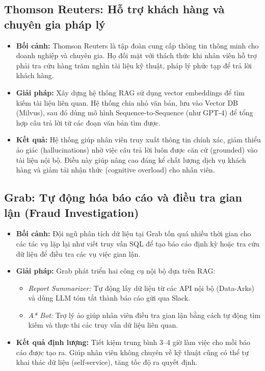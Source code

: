 \documentclass[12pt,a4paper]{report}
\begin{document}
\subsection{Thomson Reuters: Hỗ trợ khách hàng và chuyên gia pháp lý}
\begin{itemize}
    \item \textbf{Bối cảnh:} Thomson Reuters là tập đoàn cung cấp thông tin thông minh cho doanh nghiệp và chuyên gia. Họ đối mặt với thách thức khi nhân viên hỗ trợ phải tra cứu hàng trăm nghìn tài liệu kỹ thuật, pháp lý phức tạp để trả lời khách hàng.
    \item \textbf{Giải pháp:} Xây dựng hệ thống RAG sử dụng vector embeddings để tìm kiếm tài liệu liên quan. Hệ thống chia nhỏ văn bản, lưu vào Vector DB (Milvus), sau đó dùng mô hình Sequence-to-Sequence (như GPT-4) để tổng hợp câu trả lời từ các đoạn văn bản tìm được.
    \item \textbf{Kết quả:} Hệ thống giúp nhân viên truy xuất thông tin chính xác, giảm thiểu ảo giác (hallucinations) nhờ việc câu trả lời luôn được căn cứ (grounded) vào tài liệu nội bộ. Điều này giúp nâng cao đáng kể chất lượng dịch vụ khách hàng và giảm tải nhận thức (cognitive overload) cho nhân viên.
\end{itemize}

\subsection{Grab: Tự động hóa báo cáo và điều tra gian lận (Fraud Investigation)}
\begin{itemize}
    \item \textbf{Bối cảnh:} Đội ngũ phân tích dữ liệu tại Grab tốn quá nhiều thời gian cho các tác vụ lặp lại như viết truy vấn SQL để tạo báo cáo định kỳ hoặc tra cứu dữ liệu để điều tra các vụ việc gian lận.
    \item \textbf{Giải pháp:} Grab phát triển hai công cụ nội bộ dựa trên RAG:
    \begin{itemize}
        \item \textit{Report Summarizer:} Tự động lấy dữ liệu từ các API nội bộ (Data-Arks) và dùng LLM tóm tắt thành báo cáo gửi qua Slack.
        \item \textit{A* Bot:} Trợ lý ảo giúp nhân viên điều tra gian lận bằng cách tự động tìm kiếm và thực thi các truy vấn dữ liệu liên quan.
    \end{itemize}
    \item \textbf{Kết quả định lượng:} Tiết kiệm trung bình 3–4 giờ làm việc cho mỗi báo cáo được tạo ra. Giúp nhân viên không chuyên về kỹ thuật cũng có thể tự khai thác dữ liệu (self-service), tăng tốc độ ra quyết định.
\end{itemize}
\end{document}
